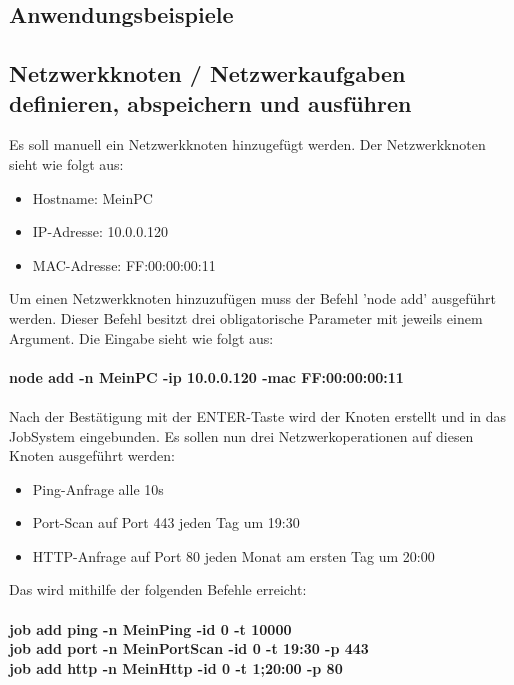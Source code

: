 \documentclass[12pt,a4paper]{report}
\begin{document}
\begin{onehalfspace}
\section{Anwendungsbeispiele}

\subsection{Netzwerkknoten / Netzwerkaufgaben definieren, abspeichern und ausführen}

Es soll manuell ein Netzwerkknoten hinzugefügt werden. Der Netzwerkknoten sieht wie folgt aus:

\begin{itemize}
  \item Hostname: MeinPC
  \item IP-Adresse: 10.0.0.120
  \item MAC-Adresse: FF:00:00:00:11
\end{itemize}

Um einen Netzwerkknoten hinzuzufügen muss der Befehl 'node add' ausgeführt werden. Dieser Befehl besitzt drei obligatorische Parameter mit jeweils einem Argument. Die Eingabe sieht wie folgt aus:\\\\

\textbf{node add -n MeinPC -ip 10.0.0.120 -mac FF:00:00:00:11}\\\\

Nach der Bestätigung mit der ENTER-Taste wird der Knoten erstellt und in das JobSystem eingebunden. Es sollen nun drei Netzwerkoperationen auf diesen Knoten ausgeführt werden:

\begin{itemize}
\item Ping-Anfrage alle 10s
\item Port-Scan auf Port 443 jeden Tag um 19:30
\item HTTP-Anfrage auf Port 80 jeden Monat am ersten Tag um 20:00
\end{itemize}

Das wird mithilfe der folgenden Befehle erreicht:\\\\

\textbf{job add ping -n MeinPing -id 0 -t 10000}\\
\textbf{job add port -n MeinPortScan -id 0 -t 19:30 -p 443}\\
\textbf{job add http -n MeinHttp -id 0 -t 1;20:00 -p 80}\\\\


\end{onehalfspace}
\end{document}
